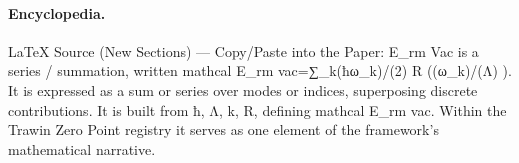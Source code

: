 \paragraph{Encyclopedia.}
LaTeX Source (New Sections) — Copy/Paste into the Paper: E\_rm Vac is a series / summation, written mathcal E\_rm vac=∑\_k(ħω\_k)/(2) R ((ω\_k)/(Λ) ). It is expressed as a sum or series over modes or indices, superposing discrete contributions. It is built from ħ, Λ, k, R, defining mathcal E\_rm vac. Within the Trawin Zero Point registry it serves as one element of the framework's mathematical narrative.

